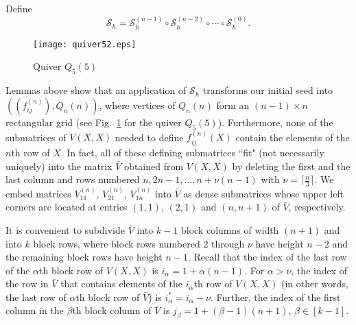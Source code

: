 \documentclass{amsart}
\theoremstyle{definition}
\theoremstyle{remark}
\numberwithin{equation}{section}
\numberwithin{theorem}{section}
\begin{document}
Define
$$
\mathcal S_h = \mathcal S_h^{(n-1)}\circ \mathcal S_h^{(n-2)}\circ \cdots \circ
\mathcal S_h^{(0)}.
$$

\begin{figure}[ht]
\begin{center}
\texttt{[image: quiver52.eps]}
\caption{Quiver $Q_5(5)$}
\label{fig:q5(5)}
\end{center}
\end{figure}

Lemmas above show that an application of $\mathcal S_h$ 
transforms our initial seed into $((f_{ij}^{(n)}), Q_n(n))$, where
vertices of $Q_n(n)$ form an $(n-1)\times n$ rectangular grid (see Fig.~\ref{fig:q5(5)} for the quiver
$Q_5(5)$). Furthermore, none of
the submatrices of $V(X,X)$ needed to define $f_{ij}^{(n)}(X)$  
contain the elements of the $n$th row of $X$. 
In fact, all of these defining submatrices ``fit"
(not necessarily uniquely) into the matrix
$\bar V$ obtained from $V(X,X)$ by deleting the first and the last column and 
rows numbered $n, 2n-1, \ldots, n + \nu (n-1)$ with
$\nu= \lceil \frac n 3 \rceil$. We embed matrices $V^{(n)}_{11}$, $V^{(n)}_{21}$, $V^{(n)}_{1n}$ into  $\bar V$ as dense submatrices
whose upper left corners are located at entries $(1,1)$, $(2,1)$ and $(n, n+1)$ of  $\bar V$, respectively.

It is convenient to subdivide  
 $\bar V$  into $k-1$ block columns of width $(n+1)$ and into $k$ block rows, where block rows numbered $2$ through
 $\nu$ have height $n-2$ and the remaining block rows have height $n-1$.
 Recall that the index of the last row of the $\alpha$th block row of $V(X,X)$ is $i_\alpha=1+\alpha(n-1)$. 
For $\alpha>\nu$, the index of the row in $\bar V$ that contains elements of the $i_\alpha$th row of $V(X,X)$ 
(in other words, the last row of $\alpha$th block row of $\bar V$) is $i^*_\alpha = i_\alpha - \nu$.
Further, the index of the first column in the $\beta$th block column of $\bar V$ is 
$j_\beta = 1 + (\beta-1)(n+1)$,  $\beta\in [k-1]$. 
\end{document}
